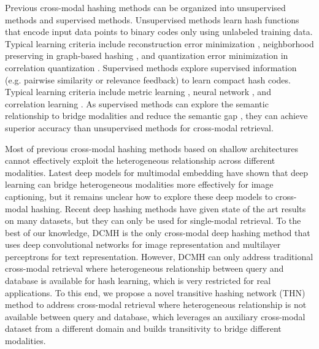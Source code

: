 \documentclass{article}
\begin{document}
Previous cross-modal hashing methods can be organized into unsupervised methods and supervised methods. Unsupervised methods learn hash functions that encode input data points to binary codes only using unlabeled training data. Typical learning criteria include reconstruction error minimization \cite{cite:VLDB14MSAE}, neighborhood preserving in graph-based hashing \cite{cite:IJCAI11CVH,cite:SIGMOD13IMH}, and quantization error minimization in correlation quantization \cite{cite:IJCAI15QCH,cite:SIGIR16CCQ}. Supervised methods explore supervised information (e.g. pairwise similarity or relevance feedback) to learn compact hash codes. Typical learning criteria include metric learning \cite{cite:CVPR10CMSSH}, neural network \cite{cite:PAMI14CMNN}, and correlation learning \cite{cite:AAAI14SCM,cite:IJCAI15QCH}. As supervised methods can explore the semantic relationship to bridge modalities  and reduce the semantic gap \cite{cite:TPAMI00SemanticGap}, they can achieve superior accuracy than unsupervised methods for cross-modal retrieval. 

Most of previous cross-modal hashing methods based on shallow architectures cannot effectively exploit the heterogeneous relationship across different modalities. Latest deep models for multimodal embedding \cite{cite:NIPS13Devise,cite:NIPS14MNLM,cite:CVPR15LRCN,cite:NIPS15mQA} have shown that deep learning can bridge heterogeneous modalities more effectively for image captioning, but it remains unclear how to explore these deep models to cross-modal hashing. Recent deep hashing methods \cite{cite:AAAI14CNNH,cite:CVPR15DNNH,cite:AAAI16DHN} have given state of the art results on many datasets, but they can only be used for single-modal retrieval. To the best of our knowledge, DCMH \cite{cite:JDCMH16} is the only cross-modal deep hashing method that uses deep convolutional networks \cite{cite:NIPS12CNN} for image representation and multilayer perceptrons \cite{cite:MIT86MLP} for text representation. However, DCMH can only address traditional cross-modal retrieval where heterogeneous relationship between query and database is available for hash learning, which is very restricted for real applications. To this end, we propose a novel transitive hashing network (THN) method to address cross-modal retrieval where heterogeneous relationship is not available between query and database, which leverages an auxiliary cross-modal dataset from a different domain and builds transitivity to bridge different modalities.
\end{document}
